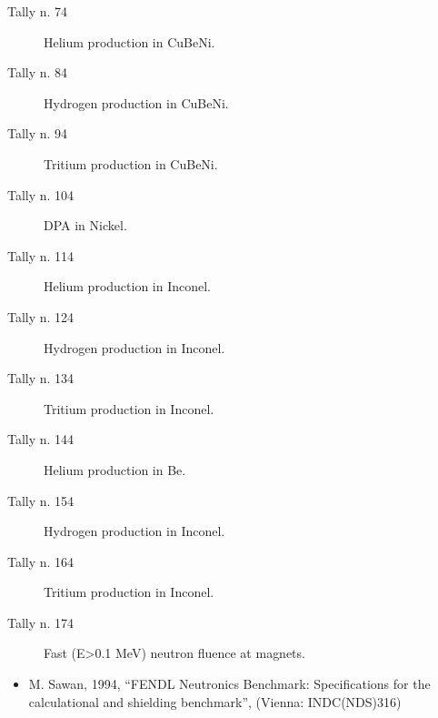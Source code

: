 \documentclass[letterpaper,10pt,english]{sphinxmanual}
\begin{document}
\begin{description}
\item[{Tally n. 74}] \leavevmode
Helium production in CuBeNi.

\item[{Tally n. 84}] \leavevmode
Hydrogen production in CuBeNi.

\item[{Tally n. 94}] \leavevmode
Tritium production in CuBeNi.

\item[{Tally n. 104}] \leavevmode
DPA in Nickel.

\item[{Tally n. 114}] \leavevmode
Helium production in Inconel.

\item[{Tally n. 124}] \leavevmode
Hydrogen production in Inconel.

\item[{Tally n. 134}] \leavevmode
Tritium production in Inconel.

\item[{Tally n. 144}] \leavevmode
Helium production in Be.

\item[{Tally n. 154}] \leavevmode
Hydrogen production in Inconel.

\item[{Tally n. 164}] \leavevmode
Tritium production in Inconel.

\item[{Tally n. 174}] \leavevmode
Fast (E\textgreater{}0.1 MeV) neutron fluence at magnets.

\end{description}




\begin{itemize}
\item {} 
M. Sawan, 1994,  “FENDL Neutronics Benchmark: Specifications for the calculational and shielding benchmark”,
(Vienna: INDC(NDS)\sphinxhyphen{}316)

\end{itemize}
\end{document}
